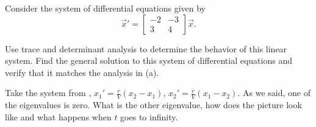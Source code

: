 \documentclass{ximera}
\begin{document}
\begin{exercise}
    Consider the system of differential equations given by 
    \begin{equation*}
        {\vec{x}}'  = \begin{bmatrix} -2 & -3 \\ 3 & 4 \end{bmatrix} \vec{x}.
    \end{equation*}
    \begin{tasks}
        \task Use trace and determinant analysis to determine the behavior of this linear system.
        \task Find the general solution to this system of differential equations and verify that it matches the analysis in (a).
    \end{tasks}
\end{exercise}

\begin{exercise}
    Take the system from , $x_1'=\frac{r}{V}(x_2-x_1)$, $x_2'=\frac{r}{V}(x_1-x_2)$. As we said, one of the eigenvalues is zero.  What is the other eigenvalue, how does the picture look like and what happens when $t$ goes to infinity.
\end{exercise}
\end{document}
